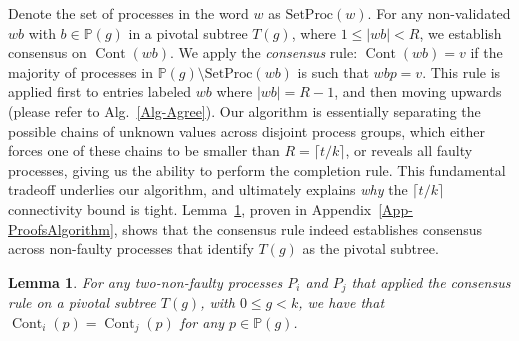 \documentclass[11pt]{article}
\newcommand{\bbP}{\ensuremath{\mathbb{P}}}
\newtheorem{lemma}[theorem]{Lemma}
\newcommand{\set}[1]{\{#1\}}
\newcommand{\setproc}[1]{\textrm{SetProc}({#1})}
\DeclareMathOperator{\cont}{Cont}
\begin{document}
Denote the set of processes in the word $w$ as $\setproc{w}$.
For any non-validated $wb$ with $b \in \bbP(g)$ in a pivotal subtree $T(g)$,
where $1 \le |wb| < R$,
we establish consensus on $\cont(wb)$.
We apply the \emph{consensus} rule:
$\cont(wb) = v$ if the majority of processes in $\bbP(g) \setminus \setproc{wb}$
is such that $wbp = v$.
This rule is applied first to entries labeled $wb$ where $|wb| = R - 1$,
and then moving upwards (please refer to Alg.~\ref{Alg-Agree}).
Our algorithm is essentially
separating the possible chains of unknown values across disjoint process groups,
which either forces one of these chains to be smaller than $R = \lceil t/k \rceil$,
or reveals all faulty processes,
giving us the ability to perform the completion rule.
This fundamental tradeoff underlies our algorithm,
and ultimately explains \emph{why} the $\lceil t/k \rceil$ connectivity bound is tight.
Lemma~\ref{lemma-consensus-pivotal},
proven in Appendix~\ref{App-ProofsAlgorithm},
shows that the consensus rule indeed establishes consensus
across non-faulty processes that identify $T(g)$ as the pivotal subtree.

\begin{comment}
The decision is based on values resulting from consensus on $T(g)$,
taking the minimum element appearing at least $t + 1$ times.
Define the multiset $C_g = \mathrm{Multiset}(\cont(p): p \in T(g))$
after applying the consensus rule,
and let $\mathrm{Decision}(C_g) = \min \set{v: v \in C_g \textrm{ with cardinality} \ge t + 1}$.
Lemma~\ref{lemma-decision-pivotal},
proven in Appendix~\ref{App-ProofsAlgorithm},
shows that,
since $|\bbP(g)| > t(d + 2)$,
such value exists,
and we can decide on a value that has been necessarily input by a non-faulty process.
\end{comment}

\begin{lemma}
\label{lemma-consensus-pivotal}
For any two-non-faulty processes $P_i$ and $P_j$ that applied the consensus rule on a pivotal subtree $T(g)$,
with $0 \le g < k$,
we have that $\cont_i(p) = \cont_j(p)$ for any $p \in \bbP(g)$.
\end{lemma}


\begin{comment}
\begin{lemma}
\label{lemma-decision-pivotal}
For any two-non-faulty processes $P_i$ and $P_j$ that decide based on a pivotal subtree $T(g)$,
with $0 \le g < k$,
the decision value
(i) is well-defined;
and (ii) is an input value of a non-faulty process.
\end{lemma}
\end{comment}
\end{document}
